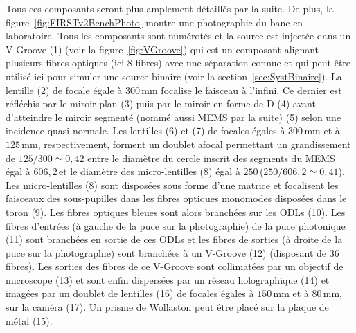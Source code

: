 Tous ces composants seront plus amplement détaillés par la suite. De plus, la figure~\ref{fig:FIRSTv2BenchPhoto} montre une photographie du banc en laboratoire. Tous les composants sont numérotés et la source est injectée dans un V-Groove (1) (voir la figure~\ref{fig:VGroove}) qui est un composant alignant plusieurs fibres optiques (ici $8$ fibres) avec une séparation connue et qui peut être utilisé ici pour simuler une source binaire (voir la section~\ref{sec:SystBinaire}). La lentille (2) de focale égale à $300 \,$mm focalise le faisceau à l'infini. Ce dernier est réfléchis par le miroir plan (3) puis par le miroir en forme de D (4) avant d'atteindre le miroir segmenté (nommé aussi \ac{MEMS} par la suite) (5) selon une incidence quasi-normale. Les lentilles (6) et (7) de focales égales à $300 \,$mm et à $125 \,$mm, respectivement, forment un doublet afocal permettant un grandissement de $125 / 300 \simeq 0,42$ entre le diamètre du cercle inscrit des segments du \ac{MEMS} égal à $606,2 \,$\um et le diamètre des micro-lentilles (8) égal à $250 \,$\um ($250 / 606,2 \simeq 0,41$). Les micro-lentilles (8) sont disposées sous forme d'une matrice et focalisent les faisceaux des sous-pupilles dans les fibres optiques monomodes disposées dans le toron (9). Les fibres optiques bleues sont alors branchées sur les \ac{ODL}s (10). Les fibres d'entrées (à gauche de la puce sur la photographie) de la puce photonique (11) sont branchées en sortie de ces \ac{ODL}s et les fibres de sorties (à droite de la puce sur la photographie) sont branchées à un V-Groove (12) (disposant de $36$ fibres). Les sorties des fibres de ce V-Groove sont collimatées par un objectif de microscope (13) et sont enfin dispersées par un réseau holographique (14) et imagées par un doublet de lentilles (16) de focales égales à $150 \,$mm et à $80 \,$mm, sur la caméra (17). Un prisme de Wollaston peut être placé sur la plaque de métal (15).

